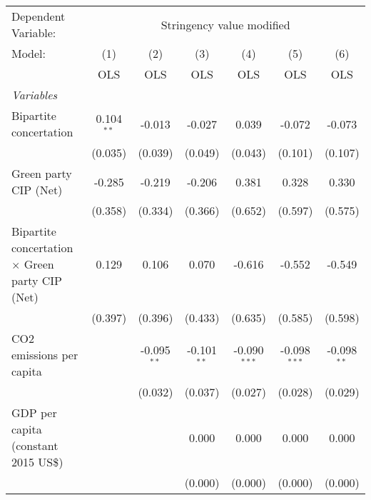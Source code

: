 
\begingroup
\centering
\begin{tabular}{lcccccc}
   \toprule
   Dependent Variable: & \multicolumn{6}{c}{Stringency value modified}\\
   Model:                                                 & (1)          & (2)           & (3)           & (4)            & (5)            & (6)\\  
                                                          &  OLS         & OLS           & OLS           & OLS            & OLS            & OLS\\  
   \midrule
   \emph{Variables}\\
   Bipartite concertation                                 & 0.104$^{**}$ & -0.013        & -0.027        & 0.039          & -0.072         & -0.073\\   
                                                          & (0.035)      & (0.039)       & (0.049)       & (0.043)        & (0.101)        & (0.107)\\   
   Green party CIP (Net)                                  & -0.285       & -0.219        & -0.206        & 0.381          & 0.328          & 0.330\\   
                                                          & (0.358)      & (0.334)       & (0.366)       & (0.652)        & (0.597)        & (0.575)\\   
   Bipartite concertation $\times$ Green party CIP (Net)  & 0.129        & 0.106         & 0.070         & -0.616         & -0.552         & -0.549\\   
                                                          & (0.397)      & (0.396)       & (0.433)       & (0.635)        & (0.585)        & (0.598)\\   
   CO2 emissions per capita                               &              & -0.095$^{**}$ & -0.101$^{**}$ & -0.090$^{***}$ & -0.098$^{***}$ & -0.098$^{**}$\\   
                                                          &              & (0.032)       & (0.037)       & (0.027)        & (0.028)        & (0.029)\\   
   GDP per capita (constant 2015 US\$)                    &              &               & 0.000         & 0.000          & 0.000          & 0.000\\   
                                                          &              &               & (0.000)       & (0.000)        & (0.000)        & (0.000)\\   

\end{tabular}
